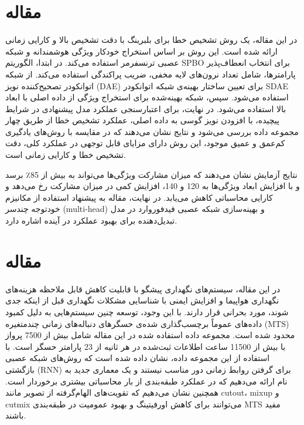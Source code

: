\documentclass[a4paper,10pt]{article}
\begin{document}

	\section{مقاله \textcolor{blue}{\cite{article14}}}
در این مقاله، یک روش تشخیص خطا برای بلبرینگ با دقت تشخیص بالا و کارایی زمانی ارائه شده است. این روش بر اساس استخراج خودکار ویژگی هوشمندانه و شبکه عصبی ترنسفرمر استفاده می‌کند. در ابتدا، الگوریتم SPBO برای انتخاب انعطاف‌پذیر پارامترها، شامل تعداد نرون‌های لایه مخفی، ضریب پراکندگی استفاده می‌کند. از شبکه اتوانکودر تصحیح‌کننده نویز (DAE) برای تعیین ساختار بهینه‌ی شبکه اتوانکودر SDAE استفاده می‌شود. سپس، شبکه بهینه‌شده   برای استخراج ویژگی از داده اصلی با ابعاد بالا استفاده می‌شود. در نهایت، برای اعتبارسنجی عملکرد مدل پیشنهادی در شرایط پیچیده، با افزودن نویز گوسی به داده اصلی، عملکرد تشخیص خطا از طریق چهار مجموعه داده بررسی می‌شود و نتایج نشان می‌دهند که در مقایسه با روش‌های یادگیری کم‌عمق و عمیق موجود، این روش دارای مزایای قابل توجهی در عملکرد کلی، دقت تشخیص خطا و کارایی زمانی است.


نتایج آزمایش نشان می‌دهند که میزان مشارکت ویژگی‌ها می‌تواند به بیش از 85٪ برسد و با افزایش ابعاد ویژگی‌ها به 120 و 140، افزایش کمی در میزان مشارکت رخ می‌دهد و کارایی محاسباتی کاهش می‌یابد. در نهایت، مقاله به پیشنهاد استفاده از مکانیزم خودتوجه چند‌سر (multi-head) و بهینه‌سازی شبکه عصبی فیدفوروارد در مدل تبدیل‌دهنده برای بهبود عملکرد در آینده اشاره دارد.


	\section{مقاله \textcolor{blue}{\cite{article9}}}
در این مقاله، سیستم‌های نگهداری پیشگو با قابلیت کاهش قابل ملاحظه هزینه‌های نگهداری هواپیما و افزایش ایمنی با شناسایی مشکلات نگهداری قبل از اینکه جدی شوند، مورد بحرانی قرار دارند. با این وجود، توسعه چنین سیستم‌هایی به دلیل کمبود داده‌های عموماً برچسب‌گذاری شده‌ی حسگرهای دنباله‌های زمانی چندمتغیره (MTS) محدود شده است. مجموعه داده استفاده شده در این مقاله شامل بیش از 7500 پرواز با بیش از 11500 ساعت اطلاعات ثبت‌شده در هر ثانیه از 23 پارامتر حسگر است. با استفاده از این مجموعه داده، نشان داده شده است که روش‌های شبکه عصبی بازگشتی (RNN) برای گرفتن روابط زمانی دور مناسب نیستند و یک معماری جدید به نام  ارائه می‌دهیم که در عملکرد طبقه‌بندی از بار محاسباتی بیشتری برخوردار است. همچنین نشان می‌دهیم که تقویت‌های الهام‌گرفته از تصویر مانند cutout، mixup و cutmix می‌توانند برای کاهش اورفیتینگ و بهبود عمومیت در طبقه‌بندی MTS مفید باشند.
\end{document}

